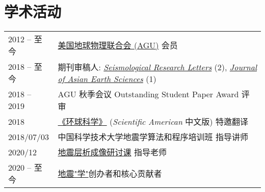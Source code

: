 \section*{学术活动}

\newcommand{\tabitem}{~~\llap{\textbullet}~~}

\begin{tabular}{p{} p{}}
2012 -- 至今 & \href{https://sites.agu.org/}{美国地球物理联合会 (AGU)} 会员 \\
2018 -- 至今 & 期刊审稿人:
                \textit{\href{https://pubs.geoscienceworld.org/srl/}{Seismological Research Letters}} (2),
                \textit{\href{https://www.journals.elsevier.com/journal-of-asian-earth-sciences/}{Journal of Asian Earth Sciences}} (1) \\
2018 -- 2019 & AGU 秋季会议 Outstanding Student Paper Award 评审 \\
2018         & \href{https://huanqiukexue.com/}{《环球科学》} (\textit{Scientific American} 中文版) 特邀翻译 \\
2018/07/03   & 中国科学技术大学地震学算法和程序培训班 指导讲师 \\
2020/12 & \href{https://migg-ntu.github.io/SeisTomo_Tutorials/}{地震层析成像研讨课} 指导老师 \\
2020 -- 至今 & \href{https://seismo-learn.org/}{地震"学"}创办者和核心贡献者 \\
\end{tabular}

